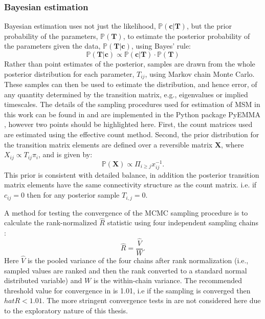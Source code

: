 \subsubsection{Bayesian estimation}\label{sec:theory_bayes}
Bayesian estimation \cite{gelmanBayesianDataAnalysis2014} uses not just the likelihood, $\mathbb{P}(\mathbf{c}|\mathbf{T})$, but the prior probability of the parameters, $\mathbb{P}(\mathbf{T})$, to estimate the posterior probability of the parameters given the data, $\mathbb{P}(\mathbf{T}|\mathbf{c})$, using Bayes' rule: 
\begin{equation}
    \mathbb{P}(\mathbf{T}|\mathbf{c}) \propto \mathbb{P}(\mathbf{c}|\mathbf{T})\cdot\mathbb{P}(\mathbf{T})
\end{equation}
Rather than point estimates of the posterior, samples are drawn from the whole posterior distribution for each parameter, $T_{ij}$, using Markov chain Monte Carlo.\cite{gelmanBayesianDataAnalysis2014} These samples can then be used to estimate the distribution, and hence error, of any quantity determined by the transition matrix, e.g., eigenvalues or implied timescales. \cite{gelmanBayesianDataAnalysis2014} The details of the sampling procedures used for estimation of MSM in this work can be found in \cite{trendelkamp-schroerEstimationUncertaintyReversible2015b} and are implemented in the Python package PyEMMA \cite{schererPyEMMASoftwarePackage2015a}, however two points should be highlighted here. First, the count matrices used are estimated using the effective count method. Second, the prior distribution for the transition matrix elements are defined over a reversible matrix $\mathbf{X}$, where $X_{ij}\propto T_{ij}\pi_{i}$, and is given by: 
\begin{equation}\label{eqn:theory_rev_prior}
    \mathbb{P}(\mathbf{X}) \propto \Pi_{i \ge j}x_{ij}^{-1}. 
\end{equation}
This prior is consistent with detailed balance, in addition the posterior transition matrix elements have the same connectivity structure as the count matrix. i.e. if $c_{ij}=0$ then for any posterior sample $T_{i,j}=0$. 

A method for testing the convergence of the MCMC sampling procedure is to calculate the rank-normalized $\hat{R}$ statistic using four independent sampling chains \cite{vehtariRanknormalizationFoldingLocalization2020}:
\begin{equation}
    \hat{R} = \frac{\hat{V}}{W}.
\end{equation}
Here $\hat{V}$ is the pooled variance of the four chains after rank normalization (i.e., sampled values are ranked and then the rank converted to a standard normal distributed variable) and $W$ is the within-chain variance. The recommended threshold value for convergence in \cite{vehtariRanknormalizationFoldingLocalization2020} is \num{1.01}, i.e if the sampling is converged then $hat{R} < 1.01$. The more stringent convergence tests in \cite{vehtariRanknormalizationFoldingLocalization2020} are not considered here due to the exploratory nature of this thesis.   

